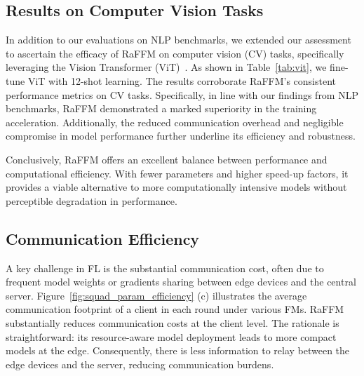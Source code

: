 \subsection{Results on Computer Vision Tasks}
\label{subsec:vision_results}

In addition to our evaluations on NLP benchmarks, we extended our assessment to ascertain the efficacy of RaFFM on computer vision (CV) tasks, specifically leveraging the Vision Transformer (ViT)~\citep{dosovitskiy2020vit}.
As shown in Table~\ref{tab:vit}, we fine-tune ViT with 12-shot learning. The results corroborate RaFFM's consistent performance metrics on CV tasks. Specifically, in line with our findings from NLP benchmarks, RaFFM demonstrated a marked superiority in the training acceleration. Additionally, the reduced communication overhead and negligible compromise in model performance further underline its efficiency and robustness.





Conclusively, RaFFM offers an excellent balance between performance and computational efficiency. With fewer parameters and higher speed-up factors, it provides a viable alternative to more computationally intensive models without perceptible degradation in performance. 


\subsection{Communication Efficiency}
A key challenge in FL is the substantial communication cost, often due to frequent model weights or gradients sharing between edge devices and the central server. 
Figure~\ref{fig:squad_param_efficiency} (c) illustrates the average communication footprint of a client in each round under various FMs. RaFFM substantially reduces communication costs at the client level. The rationale is straightforward: its resource-aware model deployment leads to more compact models at the edge. Consequently, there is less information to relay between the edge devices and the server, reducing communication burdens.

